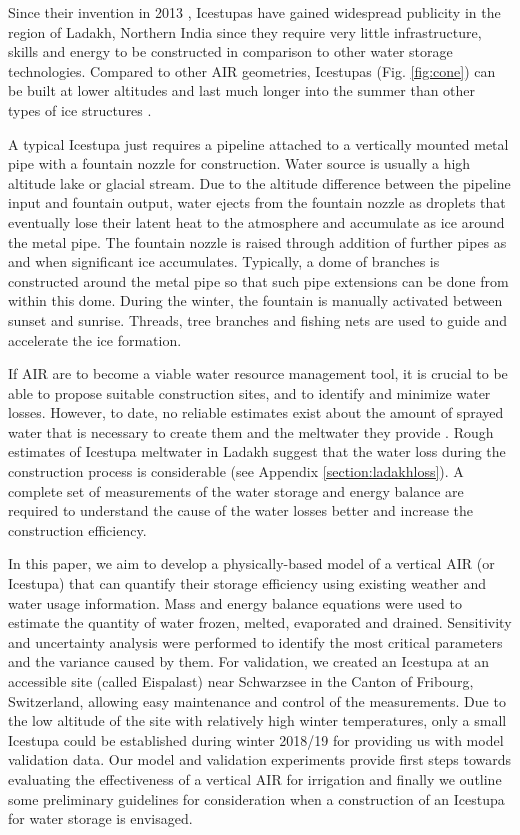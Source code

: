 \documentclass[utf8]{frontiersSCNS} %
\begin{document}
Since their invention in 2013 \citep{campaign}, Icestupas have gained widespread publicity in the region of Ladakh,
Northern India since they require very little infrastructure, skills and energy to be constructed in comparison to
other water storage technologies. Compared to other AIR geometries, Icestupas (Fig.  \ref{fig:cone}) can be built at
lower altitudes and last much longer into the summer than other types of ice structures \citep{campaign}.

A typical Icestupa just requires a pipeline attached to a vertically mounted metal pipe with a fountain nozzle for
construction. Water source is usually a high altitude lake or glacial stream. Due to the altitude difference between
the pipeline input and fountain output, water ejects from the fountain nozzle as droplets that eventually lose their
latent heat to the atmosphere and accumulate as ice around the metal pipe. The fountain nozzle is raised through
addition of further pipes as and when significant ice accumulates. Typically, a dome of branches is constructed around
the metal pipe so that such pipe extensions can be done from within this dome. During the winter, the fountain is
manually activated between sunset and sunrise. Threads, tree branches and fishing nets are used to guide and accelerate
the ice formation.

If AIR are to become a viable water resource management tool, it is crucial to be able to propose suitable construction
sites, and to identify and minimize water losses. However, to date, no reliable estimates exist about the amount of
sprayed water that is necessary to create them and the meltwater they provide \citep{Nusser_2018}. Rough estimates of
Icestupa meltwater in Ladakh suggest that the water loss during the construction process is considerable (see Appendix
\ref{section:ladakhloss}). A complete set of measurements of the water storage and energy balance are required
to understand the cause of the water losses better and increase the construction efficiency.
 
In this paper, we aim to develop a physically-based model of a vertical AIR (or Icestupa) that can quantify their
storage efficiency using existing weather and water usage information. Mass and energy balance equations were used to
estimate the quantity of water frozen, melted, evaporated and drained. Sensitivity and uncertainty analysis were
performed to identify the most critical parameters and the variance caused by them. For validation, we created an
Icestupa at an accessible site (called Eispalast) near Schwarzsee in the Canton of Fribourg, Switzerland, allowing easy
maintenance and control of the measurements. Due to the low altitude of the site with relatively high winter
temperatures, only a small Icestupa could be established during winter 2018/19 for providing us with model validation
data. Our model and validation experiments provide first steps towards evaluating the effectiveness of a vertical AIR
for irrigation and finally we outline some preliminary guidelines for consideration when a construction of an Icestupa
for water storage is envisaged. 
\end{document}
